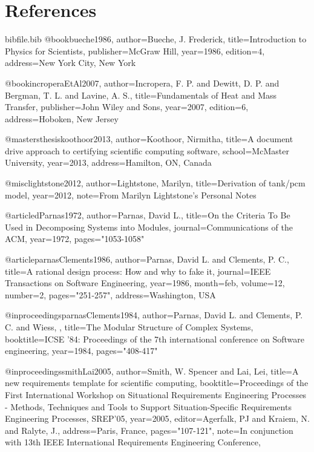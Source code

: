 \documentclass[12pt]{article}
\begin{document}
\section{References}
\label{Sec:References}
\begin{filecontents*}{bibfile.bib}
@book{bueche1986,
author={Bueche, J. Frederick},
title={Introduction to Physics for Scientists},
publisher={McGraw Hill},
year={1986},
edition={4},
address={New York City, New York}}

@book{incroperaEtAl2007,
author={Incropera, F. P. and Dewitt, D. P. and Bergman, T. L. and Lavine, A. S.},
title={Fundamentals of Heat and Mass Transfer},
publisher={John Wiley and Sons},
year={2007},
edition={6},
address={Hoboken, New Jersey}}

@mastersthesis{koothoor2013,
author={Koothoor, Nirmitha},
title={A document drive approach to certifying scientific computing software},
school={McMaster University},
year={2013},
address={Hamilton, ON, Canada}}

@misc{lightstone2012,
author={Lightstone, Marilyn},
title={Derivation of tank/pcm model},
year={2012},
note={From Marilyn Lightstone's Personal Notes}}

@article{dParnas1972,
author={Parnas, David L.},
title={On the Criteria To Be Used in Decomposing Systems into Modules},
journal={Communications of the ACM},
year={1972},
pages={"1053-1058"}}

@article{parnasClements1986,
author={Parnas, David L. and Clements, P. C.},
title={A rational design process: How and why to fake it},
journal={IEEE Transactions on Software Engineering},
year={1986},
month={feb},
volume={12},
number={2},
pages={"251-257"},
address={Washington, USA}}

@inproceedings{parnasClements1984,
author={Parnas, David L. and Clements, P. C. and Wiess, },
title={The Modular Structure of Complex Systems},
booktitle={ICSE '84: Proceedings of the 7th international conference on Software engineering},
year={1984},
pages={"408-417"}}

@inproceedings{smithLai2005,
author={Smith, W. Spencer and Lai, Lei},
title={A new requirements template for scientific computing},
booktitle={Proceedings of the First International Workshop on Situational Requirements Engineering Processes - Methods, Techniques and Tools to Support Situation-Specific Requirements Engineering Processes, SREP'05},
year={2005},
editor={Agerfalk, PJ and Kraiem, N. and Ralyte, J.},
address={Paris, France},
pages={"107-121"},
note={In conjunction with 13th IEEE International Requirements Engineering Conference,}}
\end{filecontents*}
\nocite{*}
\printbibliography[heading=none]
\end{document}
